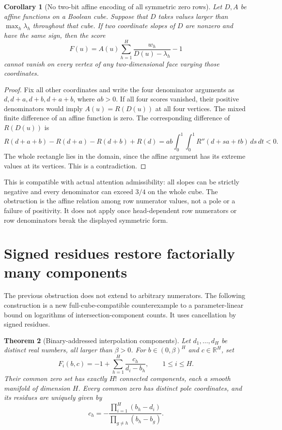 \documentclass[11pt]{article}
\newtheorem{theorem}{Theorem}
\newtheorem{corollary}[theorem]{Corollary}
\begin{document}
\begin{corollary}[No two-bit affine encoding of all symmetric zero rows]
Let $D,A$ be affine functions on a Boolean cube. Suppose that $D$
takes values larger than $\max_h\lambda_h$ throughout that cube.
If two coordinate slopes of $D$ are nonzero and have the same sign,
then the score
\[
 F(u)=A(u)\sum_{h=1}^H\frac{w_h}{D(u)-\lambda_h}-1
\]
cannot vanish on every vertex of any two-dimensional face varying
those coordinates.
\end{corollary}

\begin{proof}
Fix all other coordinates and write the four denominator arguments as
$d,d+a,d+b,d+a+b$, where $ab>0$. If all four scores vanished,
their positive denominators would imply $A(u)=R(D(u))$ at all
four vertices. The mixed finite difference of an affine function
is zero. The corresponding difference of $R(D(u))$ is
\[
 R(d+a+b)-R(d+a)-R(d+b)+R(d)
 =ab\int_0^1\int_0^1 R''(d+sa+tb)\,ds\,dt<0.
\]
The whole rectangle lies in the domain, since the affine argument
has its extreme values at its vertices. This is a contradiction.
\end{proof}

This is compatible with actual attention admissibility: all slopes
can be strictly negative and every denominator can exceed $3/4$ on
the whole cube. The obstruction is the affine relation among row
numerator values, not a pole or a failure of positivity. It does not
apply once head-dependent row numerators or row denominators break
the displayed symmetric form.

\section{Signed residues restore factorially many components}

The previous obstruction does not extend to arbitrary numerators.
The following construction is a new full-cube-compatible counterexample
to a parameter-linear bound on logarithms of intersection-component
counts. It uses cancellation by signed residues.

\begin{theorem}[Binary-addressed interpolation components]
Let $d_1,\ldots,d_H$ be distinct real numbers, all larger than $\beta>0$.
For $b\in(0,\beta)^H$ and $c\in\mathbb R^H$, set
\[
 F_i(b,c)=-1+\sum_{h=1}^H\frac{c_h}{d_i-b_h},\qquad 1\leq i\leq H.
\]
Their common zero set has exactly $H!$ connected components, each
a smooth manifold of dimension $H$. Every common zero has distinct
pole coordinates, and its residues are uniquely given by
\[
 c_h=-\frac{\prod_{i=1}^H(b_h-d_i)}
                  {\prod_{g\ne h}(b_h-b_g)}.
 \tag{1}
\]
\end{theorem}
\end{document}
